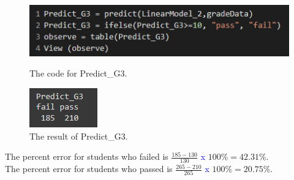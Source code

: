 \documentclass[a4paper]{article}
\begin{document}
\begin{figure}[H]
    \centering
    \begin{minipage}{0.5\textwidth}
        \centering
        \includegraphics[width = 1\linewidth]{Images/57.PNG}
        \caption{The code for Predict\_G3.}
        \label{fig:prediction3}
    \end{minipage}%
    \begin{minipage}{0.5\textwidth}
        \centering
        \includegraphics[width = 0.34\linewidth]{Images/58.PNG}
        \caption{The result of Predict\_G3.}
        \label{fig:prediction4}
    \end{minipage}
\end{figure}
The percent error for students who failed is $\frac{185 - 130}{130}$ \textcolor{blue}{x} $100\% = 42.31\% $. \\ \newline
The percent error for students who passed is $\frac{265 - 210}{265}$ \textcolor{blue}{x} $100\% = 20.75\% $. \\ \newline

\end{document}
